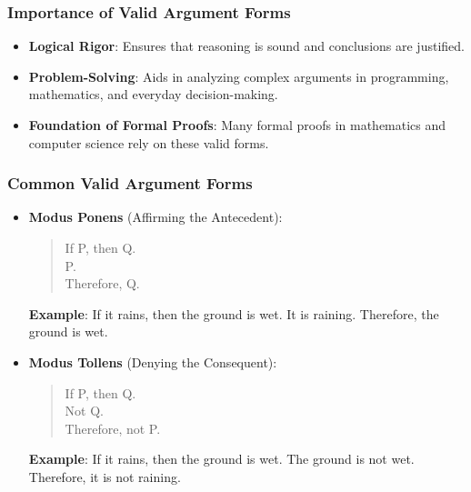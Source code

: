 \documentclass[aspectratio=169]{beamer}
\begin{document}
\begin{frame}[fragile]
    \frametitle{Importance of Valid Argument Forms}
    \begin{itemize}
        \item \textbf{Logical Rigor}: Ensures that reasoning is sound and conclusions are justified.
        \item \textbf{Problem-Solving}: Aids in analyzing complex arguments in programming, mathematics, and everyday decision-making.
        \item \textbf{Foundation of Formal Proofs}: Many formal proofs in mathematics and computer science rely on these valid forms.
    \end{itemize}
\end{frame}

\begin{frame}[fragile]
    \frametitle{Common Valid Argument Forms}
    \begin{itemize}
        \item \textbf{Modus Ponens} (Affirming the Antecedent):
        \begin{quote}
            If P, then Q.\\
            P.\\
            Therefore, Q.
        \end{quote}
        \textbf{Example}: If it rains, then the ground is wet. It is raining. Therefore, the ground is wet.

        \item \textbf{Modus Tollens} (Denying the Consequent):
        \begin{quote}
            If P, then Q.\\
            Not Q.\\
            Therefore, not P.
        \end{quote}
        \textbf{Example}: If it rains, then the ground is wet. The ground is not wet. Therefore, it is not raining.
    \end{itemize}
\end{frame}
\end{document}
